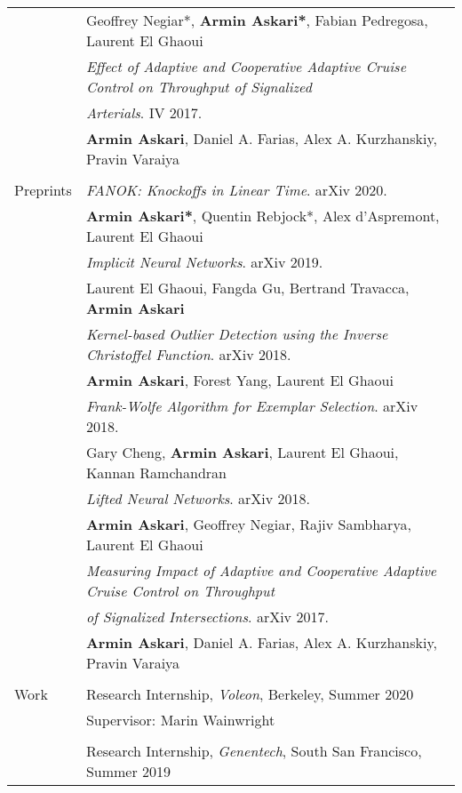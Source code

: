 \documentclass[letterpaper,10pt,oneside]{article}
\begin{document}
\begin{tabular}{@{} l l}
      & \indent \small{Geoffrey Negiar*, \textbf{Armin Askari*},  Fabian Pedregosa, Laurent El Ghaoui}\\
      & \textit{Effect of Adaptive and Cooperative Adaptive Cruise Control on Throughput of Signalized} \\
      & \textit{Arterials}. IV 2017. \\
      & \indent \small{\textbf{Armin Askari},  Daniel A. Farias, Alex A. Kurzhanskiy, Pravin Varaiya}\\
            &\\
\Large{Preprints}  
 		&  \textit{FANOK: Knockoffs in Linear Time}. arXiv  2020. \\
      & \indent \small{\textbf{Armin Askari*}, Quentin Rebjock*, Alex d'Aspremont, Laurent El Ghaoui}\\
       &  \textit{Implicit Neural Networks}. arXiv  2019. \\
      & \indent \small{Laurent El Ghaoui, Fangda Gu, Bertrand Travacca, \textbf{Armin Askari}}\\
      &  \textit{Kernel-based Outlier Detection using the Inverse Christoffel Function}. arXiv 2018. \\
      & \indent \small{\textbf{Armin Askari},  Forest Yang, Laurent El Ghaoui}\\
      &  \textit{Frank-Wolfe Algorithm for Exemplar Selection}. arXiv  2018. \\
      & \indent \small{Gary Cheng, \textbf{Armin Askari},  Laurent El Ghaoui, Kannan Ramchandran}\\
 &  \textit{Lifted Neural Networks}. arXiv 2018. \\
      & \indent \small{\textbf{Armin Askari},  Geoffrey Negiar, Rajiv Sambharya, Laurent El Ghaoui}\\
      &  \textit{Measuring Impact of Adaptive and Cooperative Adaptive Cruise Control on Throughput} \\ 	       
      & \textit{of Signalized Intersections}. arXiv 2017. \\
      & \indent \small{\textbf{Armin Askari},  Daniel A. Farias, Alex A. Kurzhanskiy, Pravin Varaiya}\\
      & \\
    \Large{Work}  & Research Internship, \textit{Voleon}, Berkeley, Summer 2020\\
    & Supervisor: Marin Wainwright \\
    &\\   
    & Research Internship, \textit{Genentech}, South San Francisco, Summer 2019\\

\end{tabular}
\end{document}

